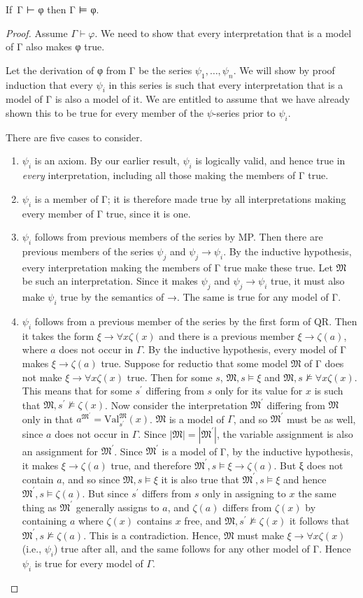 \documentclass[12pt]{report}
\theoremstyle{nonumberplain}
\newtheorem{proof}{Proof}
\newcommand{\M}{\mathfrak{M}}
\newcommand{\Val}{\mathrm{Val}}
\newcommand{\ValMsp}{\Val^{\M}_{s^{\prime}}}
\begin{document}
\begin{mt}[Soundness] If \,Γ ⊢ φ then Γ ⊨ φ.
\end{mt}
\begin{proof}
Assume $Γ ⊢ φ$. We need to show that every interpretation that is a model of Γ also makes φ true.

Let the derivation of φ from Γ be the series $ψ_1, \dotsc, ψ_n$. We will show by proof induction that every $ψ_i$ in this series is such that every interpretation that is a model of Γ is also a model of it. We are entitled to assume that we have already shown this to be true for every member of the $ψ$-series prior to $ψ_i$.

There are five cases to consider.
\begin{enumerate}
\item $ψ_i$ is an axiom. By our earlier result, $ψ_i$ is logically valid, and hence true in \emph{every} interpretation, including all those making the members of Γ true.
\item $ψ_i$ is a member of Γ; it is therefore made true by all interpretations making every member of Γ true, since it is one.

\item $ψ_i$ follows from previous members of the series by MP. Then there are previous members of the series $ψ_j$ and $ψ_j → ψ_i$. By the inductive hypothesis, every interpretation making the members of Γ true make these true. Let $\M$ be such an interpretation. Since it makes $ψ_j$ and $ψ_j → ψ_i$ true, it must also make $ψ_i$ true by the semantics of →. The same is true for any model of Γ.

\item $ψ_i$ follows from a previous member of the series by the first form of QR. Then it takes the form $ξ → ∀xζ(x)$ and there is a previous member $ξ → ζ(a)$, where $a$ does not occur in $Γ$. By the inductive hypothesis, every model of Γ makes $ξ → ζ(a)$ true. Suppose for reductio that some model $\M$ of Γ does not make $ξ → ∀xζ(x)$ true. Then for some $s$, $\M, s ⊨ ξ$ and $\M, s ⊭ ∀xζ(x)$. This means that for some $s^{\prime}$ differing from $s$ only for its value for $x$ is such that $\M, s^{\prime} ⊭ ζ(x)$. Now consider the interpretation $\M^{\prime}$ differing from $\M$ only in that $a^{\M^{\prime}} = \ValMsp(x)$. $\M$ is a model of $Γ$, and so $\M^{\prime}$ must be as well, since $a$ does not occur in $Γ$. Since $|\M| = |\M^\prime|$, the variable assignment is also an assignment for $\M^\prime$. Since $\M^{\prime}$ is a model of Γ, by the inductive hypothesis, it makes $ξ → ζ(a)$ true, and therefore $\M^{\prime}, s ⊨ ξ → ζ(a)$. But ξ does not contain $a$, and so since $\M, s ⊨ ξ$ it is also true that $\M^{\prime}, s ⊨ ξ$ and hence $\M^{\prime}, s ⊨ ζ(a)$. But since $s^\prime$ differs from $s$ only in assigning to $x$ the same thing as $\M^{\prime}$ generally assigns to $a$, and $ζ(a)$ differs from $ζ(x)$ by containing $a$ where $ζ(x)$ contains $x$ free, and $\M, s^{\prime} ⊭ ζ(x)$ it follows that $\M^{\prime}, s ⊭ ζ(a)$. This is a contradiction. Hence, $\M$ must make $ξ → ∀xζ(x)$ (i.e., $ψ_i$) true after all, and the same follows for any other model of Γ. Hence $ψ_i$ is true for every model of $Γ$.


\end{enumerate}
\end{proof}
\end{document}
